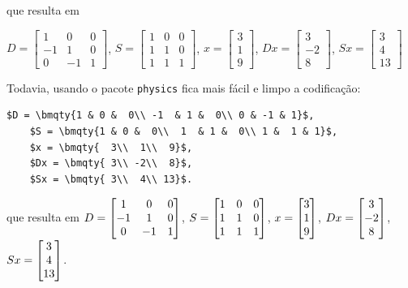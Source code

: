 que resulta em

$D = \begin{bmatrix} 
	1   &  0 &    0\\
	-1   &  1&     0\\
	0   & -1 &    1
\end{bmatrix}$, 
$ S = \begin{bmatrix} 1    & 0   &  0\\ 1    & 1   &  0\\ 1   &  1   &  1 \end{bmatrix}$,
$x = \begin{bmatrix} 3\\ 1\\ 9 \end{bmatrix}$,   $Dx = \begin{bmatrix} 3\\ -2\\8 \end{bmatrix}$, $Sx = \begin{bmatrix} 3\\ 4\\ 13 \end{bmatrix}$

Todavia, usando o pacote \texttt{physics} fica mais  fácil e limpo a codificação:
\begin{lstlisting}[language={[Latex]Tex},frame=single]
	$D = \bmqty{1 & 0 &  0\\ -1  & 1 &  0\\ 0 & -1 & 1}$, 
	$S = \bmqty{1 & 0 &  0\\  1  & 1 &  0\\ 1 &  1 & 1}$, 
	$x = \bmqty{  3\\  1\\  9}$,   
	$Dx = \bmqty{ 3\\ -2\\  8}$, 
	$Sx = \bmqty{ 3\\  4\\ 13}$.
\end{lstlisting}

que resulta em 
$D = \bmqty{1   &  0 &    0\\-1   &  1&     0\\0   & -1 &    1}$, $ S = \bmqty{ 1    & 0   &  0\\ 1    & 1   &  0\\ 1   &  1   &  1 }$, $x = \bmqty{ 3\\ 1\\ 9 }$,   $Dx = \bmqty{ 3 \\ -2 \\ 8 }$, $Sx = \bmqty{ 3\\ 4\\ 13 }$.


